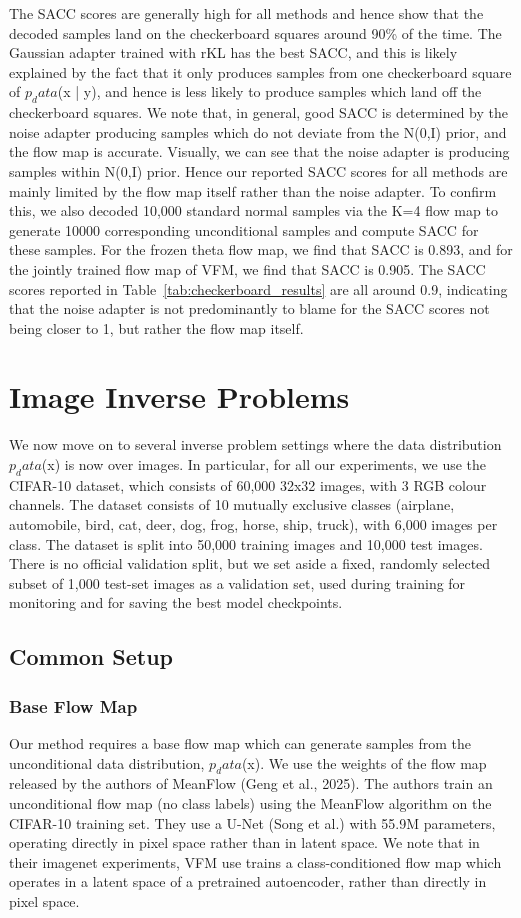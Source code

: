 \documentclass[12pt,a4paper]{report}
\begin{document}
The SACC scores are generally high for all methods and hence show that the decoded samples land on the checkerboard squares around 90\% of the time. 
The Gaussian adapter trained with rKL has the best SACC, and this is likely explained by the fact that it only produces samples from one checkerboard square of $p_data$(x | y), and hence is less likely to produce samples which land off the checkerboard squares.
We note that, in general, good SACC is determined by the noise adapter producing samples which do not deviate from the N(0,I) prior, and the flow map is accurate. 
Visually, we can see that the noise adapter is producing samples within N(0,I) prior. 
Hence our reported SACC scores for all methods are mainly limited by the flow map itself rather than the noise adapter. 
To confirm this, we also decoded 10,000 standard normal samples via the K=4 flow map to generate 10000 corresponding unconditional samples and compute SACC for these samples. For the frozen theta flow map, we find that SACC is 0.893, and for the jointly trained flow map of VFM, we find that SACC is 0.905. 
The SACC scores reported in Table~\ref{tab:checkerboard_results} are all around 0.9, indicating that the noise adapter is not predominantly to blame for the SACC scores not being closer to 1, but rather the flow map itself.

\section{Image Inverse Problems}
We now move on to several inverse problem settings where the data distribution $p_data$(x) is now over images. 
In particular, for all our experiments, we use the CIFAR-10 dataset, which consists of 60,000 32x32 images, with 3 RGB colour channels. 
The dataset consists of 10 mutually exclusive classes (airplane, automobile, bird, cat, deer, dog, frog, horse, ship, truck), with 6,000 images per class.
The dataset is split into 50,000 training images and 10,000 test images. 
There is no official validation split, but we set aside a fixed, randomly selected subset of 1,000 test-set images as a validation set, used during training for monitoring and for saving the best model checkpoints.

\subsection{Common Setup}
\subsubsection{Base Flow Map}
Our method requires a base flow map which can generate samples from the unconditional data distribution, $p_data$(x).
We use the weights of the flow map released by the authors of MeanFlow (Geng et al., 2025).
The authors train an unconditional flow map (no class labels) using the MeanFlow algorithm on the CIFAR-10 training set. 
They use a U-Net (Song et al.) with 55.9M parameters, operating directly in pixel space rather than in latent space. 
We note that in their imagenet experiments, VFM use trains a class-conditioned flow map which operates in a latent space of a pretrained autoencoder, rather than directly in pixel space.
\end{document}
